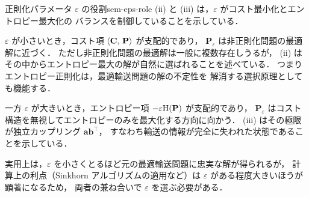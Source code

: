 \begin{remark}{正則化パラメータ $\varepsilon$ の役割}{sem-eps-role}
  (ii) と (iii) は，$\varepsilon$ がコスト最小化とエントロピー最大化の
  バランスを制御していることを示している．

  $\varepsilon$ が小さいとき，コスト項 $\langle \mathbf{C},\, \mathbf{P} \rangle$ が支配的であり，
  $\mathbf{P}_\varepsilon$ は非正則化問題の最適解に近づく．
  ただし非正則化問題の最適解は一般に複数存在しうるが，
  (ii) はその中からエントロピー最大の解が自然に選ばれることを述べている．
  つまりエントロピー正則化は，最適輸送問題の解の不定性を
  解消する選択原理としても機能する．

  一方 $\varepsilon$ が大きいとき，エントロピー項 $-\varepsilon\mathrm{H}(\mathbf{P})$ が支配的であり，
  $\mathbf{P}_\varepsilon$ はコスト構造を無視してエントロピーのみを最大化する方向に向かう．
  (iii) はその極限が独立カップリング $\mathbf{a}\mathbf{b}^\top$，
  すなわち輸送の情報が完全に失われた状態であることを示している．

  実用上は，$\varepsilon$ を小さくとるほど元の最適輸送問題に忠実な解が得られるが，
  計算上の利点（Sinkhorn アルゴリズムの適用など）は
  $\varepsilon$ がある程度大きいほうが顕著になるため，
  両者の兼ね合いで $\varepsilon$ を選ぶ必要がある．
\end{remark}
